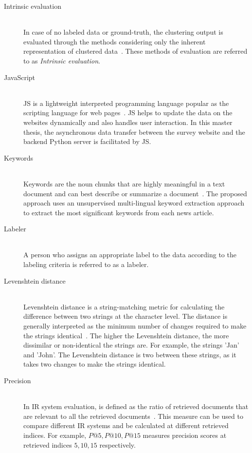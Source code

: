 \begin{description}
		\item[Intrinsic evaluation] \hfill \\ In case of no labeled data or ground-truth, the clustering output is evaluated through the methods considering only the inherent representation of clustered data~\cite{de2012document}. These methods of evaluation are referred to as \emph{Intrinsic evaluation}. 
		
			\item[JavaScript] \hfill \\ \ac{JS} is a lightweight interpreted programming language popular as the scripting language for web pages~\cite{mozillaWhatJavaScript}. \ac{JS} helps to update
		the data on the websites dynamically and also handles user interaction. In this master thesis, the
		asynchronous data transfer between the survey website and the backend Python server
		is facilitated by \ac{JS}.
		
			\item[Keywords] \hfill \\ Keywords are the noun chunks that are highly meaningful in a text document and can best describe or summarize a document~\cite{beliga2014keyword}. The proposed approach uses an unsupervised multi-lingual keyword extraction approach to extract the most significant keywords from each news article.
			
			
	\item[Labeler] \hfill \\ A person who assigns an appropriate label to the data according to the labeling criteria is referred to as a labeler.
	
		\item[Levenshtein distance] \hfill \\ Levenshtein distance is a string-matching metric for calculating the difference between two strings at the character level. The distance is generally interpreted as the minimum number of changes required to make the strings identical~\cite{redisWhatFuzzy}. The higher the Levenshtein distance, the more dissimilar or non-identical the strings are. For example, the strings 'Jan' and 'John'. The Levenshtein distance is two between these strings, as it takes two changes to make the strings identical.
	
			
			
				\item[Precision] \hfill \\     In IR system evaluation,  is defined as the ratio of retrieved documents that are relevant to all the retrieved documents~\cite{zuva2012evaluation}. This measure can be used to compare different IR systems and be calculated at different retrieved indices. For example, $P@5, P@10, P@15$ measures precision scores at retrieved indices $5, 10, 15$ respectively.
			

\end{description}
